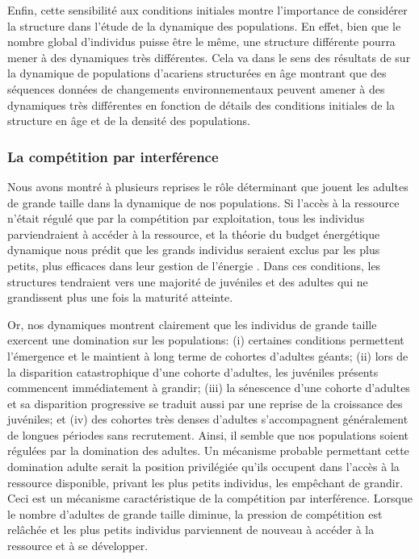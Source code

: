 Enfin, cette sensibilité aux conditions initiales montre l'importance de
considérer la structure dans l'étude de la dynamique des populations. En effet,
bien que le nombre global d'individus  puisse être le même, une structure
différente pourra mener à des dynamiques très différentes. 
Cela va dans le sens des résultats de \textcites{benton2005a} sur la dynamique de populations
d'acariens structurées en âge montrant que des séquences données de changements
environnementaux peuvent amener à des dynamiques très différentes en fonction de
détails des conditions initiales de la structure en âge et de la densité des
populations.

\subsubsection{La compétition par interférence}

Nous avons montré à plusieurs reprises le rôle déterminant que jouent les
adultes de grande taille dans la dynamique de nos populations. Si l'accès à la ressource
n'était régulé que par la compétition par exploitation, tous les individus
parviendraient à accéder à la ressource, et la théorie du budget énergétique
dynamique nous prédit que les grands individus seraient exclus par les plus
petits, plus efficaces dans leur gestion de l'énergie
\autocites{kooijman1984a,de-roos1997a}. Dans ces conditions, les structures tendraient
vers une majorité de juvéniles et des adultes qui ne grandissent plus une fois la maturité atteinte. 

Or, nos dynamiques montrent clairement que les individus de grande taille
exercent une domination sur les populations: (i) certaines conditions permettent
l'émergence et le maintient à long terme de cohortes d'adultes géants; (ii) lors
de la disparition catastrophique d'une cohorte d'adultes, les juvéniles présents
commencent immédiatement à grandir; (iii) la sénescence d'une cohorte d'adultes
et sa disparition progressive se traduit aussi par une reprise de la croissance
des juvéniles; et (iv) des cohortes très denses d'adultes s'accompagnent
généralement de longues périodes sans recrutement. Ainsi, il semble que nos
populations soient régulées par la domination des adultes. Un mécanisme probable
permettant cette domination adulte serait la position privilégiée qu'ils
occupent dans l'accès à la ressource disponible, privant les plus petits
individus, les empêchant de grandir. Ceci est un mécanisme caractéristique de la
compétition par interférence. Lorsque le nombre d'adultes de grande taille
diminue, la pression de compétition est relâchée et les plus petits individus
parviennent de nouveau à accéder à la ressource et à se développer.


